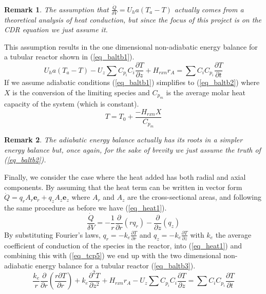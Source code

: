 \documentclass[11pt,fleqn]{article}
\theoremstyle{defstyle}
\newtheorem{rmrk}{Remark}[section]
\begin{document}
\begin{rmrk}
The assumption that $\frac{\dot{Q}}{\delta V} = U_ha(T_a-T)$ actually comes from a theoretical analysis of heat conduction, but since the focus of this project is on the CDR equation we just assume it. 
\end{rmrk} 
This assumption results in the one dimensional non-adiabatic energy balance for a tubular reactor shown in (\ref{eq_baltb1}).
\begin{equation}
U_ha(T_a-T) - U_z\sum C_{p_i}C_i \frac{\partial T}{\partial z} + H_{rxn}r_A = \sum C_i C_{p_i} \frac{\partial T}{\partial t}
\label{eq_baltb1}
\end{equation}
If we assume adiabatic conditions (\ref{eq_baltb1}) simplifies to (\ref{eq_baltb2}) where $X$ is the conversion of the limiting species and $C_{p_m}$ is the average molar heat capacity of the system (which is constant).
\begin{equation}
T = T_0 + \frac{-H_{rxn}X}{C_{p_m}}
\label{eq_baltb2}
\end{equation}
\begin{rmrk}
The adiabatic energy balance actually has its roots in a simpler energy balance but, once again, for the sake of brevity we just assume the truth of (\ref{eq_baltb2}).
\end{rmrk}
Finally, we consider the case where the heat added has both radial and axial components. By assuming that the heat term can be written in vector form $\dot{Q} = q_r A_r \mathbf{e}_r + q_z A_z \mathbf{e}_z$  where $A_r$ and $A_z$ are the cross-sectional areas, and following the same procedure as before we have (\ref{eq_heat1}).
\begin{equation}
\frac{\dot{Q}}{\delta V} = -\frac{1}{r}\frac{\partial}{\partial r}\left(r q_r\right) - \frac{\partial}{\partial z}\left(q_z\right)
\label{eq_heat1}
\end{equation}
By substituting Fourier's laws, $q_r = -k_e\frac{\partial T}{\partial r}$ and $q_z = -k_e\frac{\partial T}{\partial z}$ with $k_e$ the average coefficient of conduction of the species in the reactor, into (\ref{eq_heat1}) and combining this with (\ref{eq_tcp5}) we end up with the two dimensional non-adiabatic energy balance for a tubular reactor (\ref{eq_baltb3}).
\begin{equation}
\frac{k_e}{r}\frac{\partial}{\partial r}\left(\frac{r\partial T}{\partial r}\right) + k_e\frac{\partial ^2 T}{\partial z^2} + H_{rxn}r_A - U_z\sum C_{p_i}C_i \frac{\partial T}{\partial z} =\sum C_i C_{p_i} \frac{\partial T}{\partial t}
\label{eq_baltb3}
\end{equation}
\end{document}
